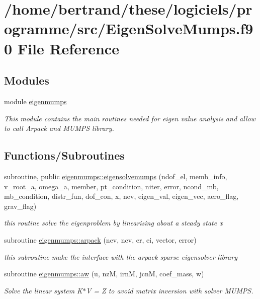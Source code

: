 \hypertarget{_eigen_solve_mumps_8f90}{}\section{/home/bertrand/these/logiciels/programme/src/\+Eigen\+Solve\+Mumps.f90 File Reference}
\label{_eigen_solve_mumps_8f90}
\subsection*{Modules}
\begin{DoxyCompactItemize}
\item 
module \hyperlink{namespaceeigenmumps}{eigenmumps}
\begin{DoxyCompactList}\small\item\em This module contains the main routines needed for eigen value analysis and allow to call Arpack and M\+U\+M\+PS library. \end{DoxyCompactList}\end{DoxyCompactItemize}
\subsection*{Functions/\+Subroutines}
\begin{DoxyCompactItemize}
\item 
subroutine, public \hyperlink{namespaceeigenmumps_ae4a95ffe93412104411a9914edccd507}{eigenmumps\+::eigensolvemumps} (ndof\+\_\+el, memb\+\_\+info, v\+\_\+root\+\_\+a, omega\+\_\+a, member, pt\+\_\+condition, niter, error, ncond\+\_\+mb, mb\+\_\+condition, distr\+\_\+fun, dof\+\_\+con, x, nev, eigen\+\_\+val, eigen\+\_\+vec, aero\+\_\+flag, grav\+\_\+flag)
\begin{DoxyCompactList}\small\item\em this routine solve the eigenproblem by linearising about a steady state x \end{DoxyCompactList}\item 
subroutine \hyperlink{namespaceeigenmumps_a86ca8fa64997377eaafa9b3b69a86d49}{eigenmumps\+::arpack} (nev, ncv, er, ei, vector, error)
\begin{DoxyCompactList}\small\item\em this subroutine make the interface with the arpack sparse eigensolver library \end{DoxyCompactList}\item 
subroutine \hyperlink{namespaceeigenmumps_ac941735ba53914846bfec44d74ad79c6}{eigenmumps\+::aw} (u, nzM, irnM, jcnM, coef\+\_\+mass, w)
\begin{DoxyCompactList}\small\item\em Solve the linear system K$\ast$V = Z to avoid matrix inversion with solver M\+U\+M\+PS. \end{DoxyCompactList}\end{DoxyCompactItemize}

